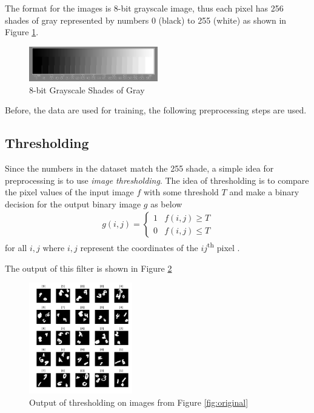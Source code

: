 \documentclass[letterpaper, 10 pt, conference]{ieeeconf}  %
\begin{document}
 The format for the images is 8-bit grayscale image, thus each pixel has 256 shades of gray represented by numbers 0 (black) to 255 (white) as shown in Figure \ref{fig:maxeig2}.

	
\begin{figure}[h]
	\begin{center}
			\includegraphics[width=0.5\textwidth]{figures/21stepwide8bit.jpg}  %
		\caption{8-bit Grayscale Shades of Gray}
		\label{fig:maxeig2}
	\end{center}
\end{figure}

Before, the data are used for training, the following preprocessing steps are used.

\subsection{Thresholding} 
Since the numbers in the dataset match the 255 shade, a simple idea for preprocessing is to use \textit{image thresholding}. 
The idea of thresholding is to compare the pixel values of the input image $f$ with some threshold $T$ and make a binary decision for the output binary image $g$ as below
\begin{align}
g(i,j) = \begin{cases}
1 & f(i,j)\ge T\\
0 & f(i,j)\le T
\end{cases}
\end{align}
for all $i, j$ where $i, j$ represent the coordinates of the $ij$\textsuperscript{th} pixel \cite{bovik2009essential}.

The output of this filter is shown in Figure \ref{fig:thresholded}

\begin{figure}[h]
	\begin{center}
		\includegraphics[width=0.4\textwidth]{figures/thresholdDataset.pdf}  %
		\caption{Output of thresholding on images from Figure \ref{fig:original}}
		\label{fig:thresholded}
	\end{center}
\end{figure}
\end{document}
